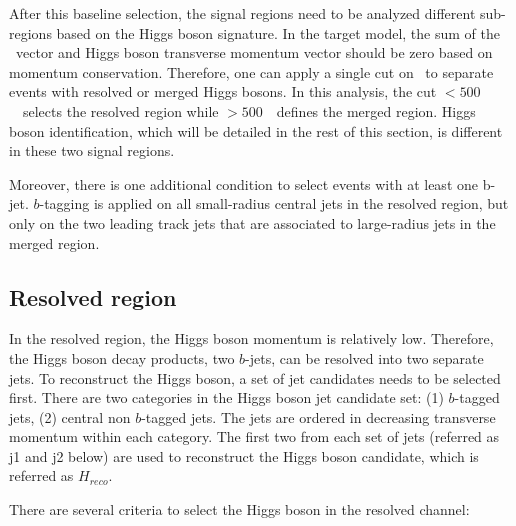 \par After this baseline selection, the signal regions need to be analyzed different sub-regions based on the Higgs boson signature. In the target model, the sum of the \met~vector and Higgs boson transverse momentum vector should be zero based on momentum conservation. Therefore, one can apply a single cut on \met~to separate events with resolved or merged Higgs bosons. In this analysis, the cut \met$<500$~\GeV~selects the resolved region while \met$>500$~\GeV~defines the merged region. Higgs boson identification, which will be detailed in the rest of this section, is different in these two signal regions.
\par Moreover, there is one additional condition to select events with at least one b-jet. $b$-tagging is applied on all small-radius central jets in the resolved region, but only on the two leading track jets that are associated to large-radius jets in the merged region.

\subsection{Resolved region}

\par In the resolved region, the Higgs boson momentum is relatively low. Therefore, the Higgs boson decay products, two $b$-jets, can be resolved into two separate jets. To reconstruct the Higgs boson, a set of jet candidates needs to be selected first. There are two categories in the Higgs boson jet candidate set: (1) $b$-tagged jets, (2) central non $b$-tagged jets. The jets are ordered in decreasing transverse momentum within each category. The first two from each set of jets (referred as j1 and j2 below) are used to reconstruct the Higgs boson candidate, which is referred as $H_{reco}$.

\par There are several criteria to select the Higgs boson in the resolved channel:

